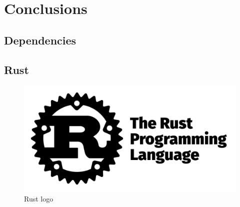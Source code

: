\chapter{Conclusions}
\label{cha:conclusions}

\section{Dependencies}
\label{sec:conclusions_dependencies}

\section{Rust}
\label{sec:conclusions_rust}

\begin{figure}
  \centering
  \includegraphics[width=.25\textwidth]{images/logos/rust.png}
  \caption{Rust logo}
\end{figure}